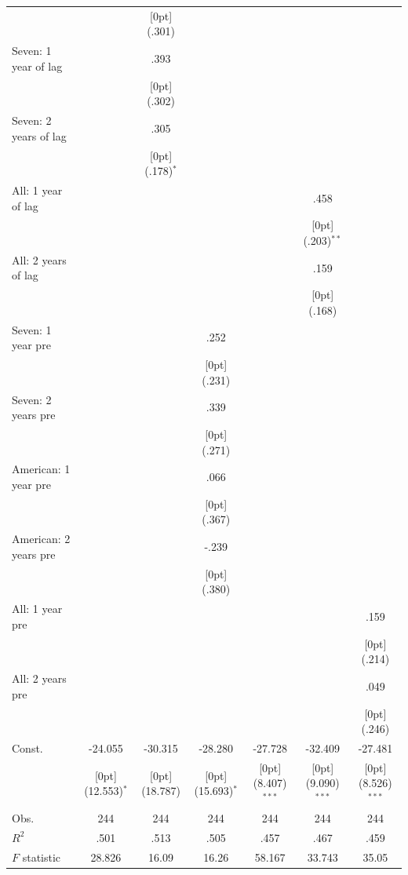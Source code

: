 \documentclass[12pt,a4paper,titlepage]{article}
\begin{document}
{\begin{tabular*}{\textwidth}{@{\extracolsep{\fill}}lcccccc}
&	&	\raisebox{.7ex}[0pt]{\scriptsize (.301)} &	&	&	&	\\
Seven: 1 year of lag &	&	.393 &	&	&	&	\\
&	&	\raisebox{.7ex}[0pt]{\scriptsize (.302)} &	&	&	&	\\
Seven: 2 years of lag&	&	.305 &	&	&	&	\\
&	&	\raisebox{.7ex}[0pt]{\scriptsize (.178)$^{*}$} &	&	&	&	\\
All: 1 year of lag &	&	&	&	&	.458 &	\\
&	&	&	&	&	\raisebox{.7ex}[0pt]{\scriptsize (.203)$^{**}$} &	\\
All: 2 years of lag &	&	&	&	&	.159 &	\\
&	&	&	&	&	\raisebox{.7ex}[0pt]{\scriptsize (.168)} &	\\
Seven: 1 year pre &	&	&	.252 &	&	&	\\
&	&	&	\raisebox{.7ex}[0pt]{\scriptsize (.231)} &	&	&	\\
Seven: 2 years pre &	&	&	.339 &	&	&	\\
&	&	&	\raisebox{.7ex}[0pt]{\scriptsize (.271)} &	&	&	\\
American: 1 year pre &	&	&	.066 &	&	&	\\
&	&	&	\raisebox{.7ex}[0pt]{\scriptsize (.367)} &	&	&	\\
American: 2 years pre &	&	&	-.239 &	&	&	\\
&	&	&	\raisebox{.7ex}[0pt]{\scriptsize (.380)} &	&	&	\\
All: 1 year pre &	&	&	&	&	&	.159 \\
&	&	&	&	&	&	\raisebox{.7ex}[0pt]{\scriptsize (.214)} \\
All: 2 years pre &	&	&	&	&	&	.049 \\
&	&	&	&	&	&	\raisebox{.7ex}[0pt]{\scriptsize (.246)} \\
Const. &	-24.055 &	-30.315 &	-28.280 &	-27.728 &	-32.409 &	-27.481 \\
&	\raisebox{.7ex}[0pt]{\scriptsize (12.553)$^{*}$} &	\raisebox{.7ex}[0pt]{\scriptsize (18.787)} &	\raisebox{.7ex}[0pt]{\scriptsize (15.693)$^{*}$} &	\raisebox{.7ex}[0pt]{\scriptsize (8.407)$^{***}$} &	\raisebox{.7ex}[0pt]{\scriptsize (9.090)$^{***}$} &	\raisebox{.7ex}[0pt]{\scriptsize (8.526)$^{***}$} \\
Obs. &	244 &	244 &	244 &	244 &	244 &	244 \\
$ R^2$ &	.501 &	.513 &	.505 &	.457 &	.467 &	.459 \\
$ F$ statistic &	28.826 &	16.09 &	16.26 &	58.167 &	33.743 &	35.05 \\
\hline\hline						
\end{tabular*}

}
\end{document}
